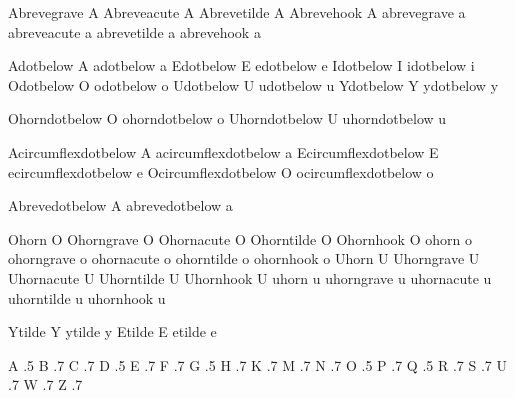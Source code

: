   \inherithandling Abrevegrave A
  \inherithandling Abreveacute A
  \inherithandling Abrevetilde A
  \inherithandling Abrevehook  A
  \inherithandling abrevegrave a
  \inherithandling abreveacute a
  \inherithandling abrevetilde a
  \inherithandling abrevehook  a

  \inherithandling Adotbelow A
  \inherithandling adotbelow a
  \inherithandling Edotbelow E
  \inherithandling edotbelow e
  \inherithandling Idotbelow I
  \inherithandling idotbelow i
  \inherithandling Odotbelow O
  \inherithandling odotbelow o
  \inherithandling Udotbelow U
  \inherithandling udotbelow u
  \inherithandling Ydotbelow Y
  \inherithandling ydotbelow y

  \inherithandling Ohorndotbelow O
  \inherithandling ohorndotbelow o
  \inherithandling Uhorndotbelow U
  \inherithandling uhorndotbelow u

  \inherithandling Acircumflexdotbelow A
  \inherithandling acircumflexdotbelow a
  \inherithandling Ecircumflexdotbelow E
  \inherithandling ecircumflexdotbelow e
  \inherithandling Ocircumflexdotbelow O
  \inherithandling ocircumflexdotbelow o

  \inherithandling Abrevedotbelow A
  \inherithandling abrevedotbelow a

  \inherithandling Ohorn      O
  \inherithandling Ohorngrave O
  \inherithandling Ohornacute O
  \inherithandling Ohorntilde O
  \inherithandling Ohornhook  O
  \inherithandling ohorn      o
  \inherithandling ohorngrave o
  \inherithandling ohornacute o
  \inherithandling ohorntilde o
  \inherithandling ohornhook  o
  \inherithandling Uhorn      U
  \inherithandling Uhorngrave U
  \inherithandling Uhornacute U
  \inherithandling Uhorntilde U
  \inherithandling Uhornhook  U
  \inherithandling uhorn      u
  \inherithandling uhorngrave u
  \inherithandling uhornacute u
  \inherithandling uhorntilde u
  \inherithandling uhornhook  u

  \inherithandling Ytilde Y
  \inherithandling ytilde y
  \inherithandling Etilde E
  \inherithandling etilde e

\stopfonthandling

\startfonthandling [hz]

     A .5
     B .7
     C .7
     D .5
     E .7
     F .7
     G .5
     H .7
     K .7
     M .7
     N .7
     O .5
     P .7
     Q .5
     R .7
     S .7
     U .7
     W .7
     Z .7

